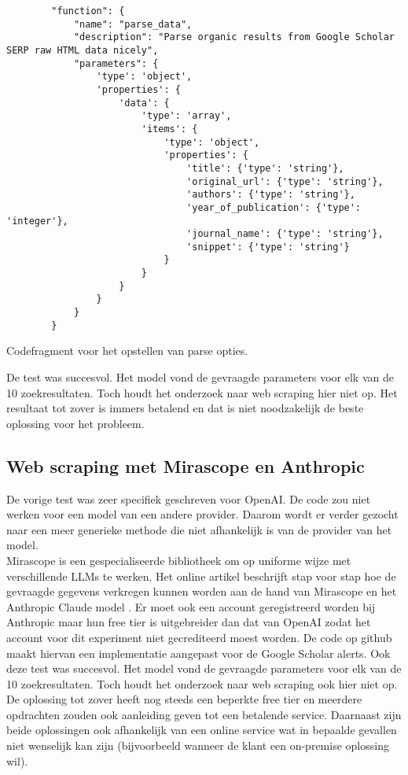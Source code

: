 \begin{listing}
    \begin{verbatim}
        "function": {
            "name": "parse_data",
            "description": "Parse organic results from Google Scholar SERP raw HTML data nicely",
            "parameters": {
                'type': 'object',
                'properties': {
                    'data': {
                        'type': 'array',
                        'items': {
                            'type': 'object',
                            'properties': {
                                'title': {'type': 'string'},
                                'original_url': {'type': 'string'},
                                'authors': {'type': 'string'},
                                'year_of_publication': {'type': 'integer'},
                                'journal_name': {'type': 'string'},
                                'snippet': {'type': 'string'}
                            }
                        }
                    }
                }
            }
        }
    \end{verbatim}
    \caption[Parse opties codefragment]{Codefragment voor het opstellen van parse opties.}
    \label{code:Parse opties codefragment}
\end{listing}
De test was succesvol. Het model vond de gevraagde parameters voor elk van de 10 zoekresultaten. Toch houdt het onderzoek naar web scraping hier niet op. Het resultaat tot zover is immers betalend en dat is niet noodzakelijk de beste oplossing voor het probleem.

\subsection{Web scraping met Mirascope en Anthropic}
De vorige test was zeer specifiek geschreven voor OpenAI. De code zou niet werken voor een model van een andere provider. Daarom wordt er verder gezocht naar een meer generieke methode die niet afhankelijk is van de provider van het model.\\
Mirascope \textcite{Mirascope2025} is een gespecialiseerde bibliotheek om op uniforme wijze met verschillende LLMs te werken.
Het online artikel \textcite{Anthropic2025} beschrijft stap voor stap hoe de gevraagde gegevens verkregen kunnen worden aan de hand van Mirascope en het Anthropic Claude model \autocite{Anthropicmodel2025}. Er moet ook een account geregistreerd worden bij Anthropic maar hun free tier is uitgebreider dan dat van OpenAI zodat het account voor dit experiment niet gecrediteerd moest worden.
De code op github \textcite{Depaepeanthropic2025} maakt hiervan een implementatie aangepast voor de Google Scholar alerts.
Ook deze test was succesvol. Het model vond de gevraagde parameters voor elk van de 10 zoekresultaten. Toch houdt het onderzoek naar web scraping ook hier niet op. De oplossing tot zover heeft nog steeds een beperkte free tier en meerdere opdrachten zouden ook aanleiding geven tot een betalende service.
Daarnaast zijn beide oplossingen ook afhankelijk van een online service wat in bepaalde gevallen niet wenselijk kan zijn (bijvoorbeeld wanneer de klant een on-premise oplossing wil).

